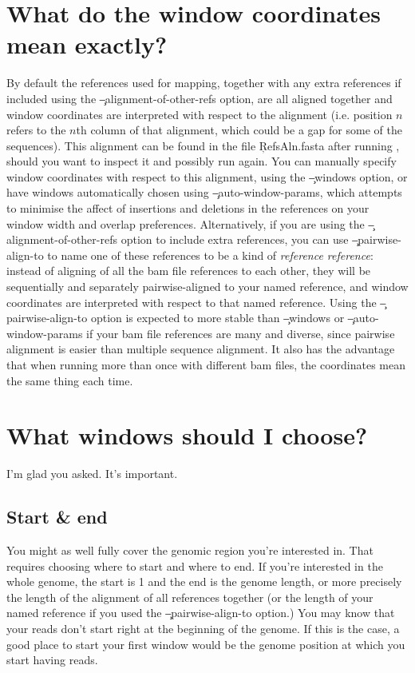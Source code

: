 \section{What do the window coordinates mean exactly?}
By default the references used for mapping, together with any extra references if included using the \c{--alignment-of-other-refs} option, are all aligned together and window coordinates are interpreted with respect to the alignment (i.e. position $n$ refers to the $n$th column of that alignment, which could be a gap for some of the sequences).
This alignment can be found in the file \c{RefsAln.fasta} after running \p, should you want to inspect it and possibly run again.
You can manually specify window coordinates with respect to this alignment, using the \c{--windows} option, or have windows automatically chosen using \c{--auto-window-params}, which attempts to minimise the affect of insertions and deletions in the references on your window width and overlap preferences.
Alternatively, if you are using the \c{--alignment-of-other-refs} option to include extra references, you can use \c{--pairwise-align-to} to name one of these references to be a kind of {\it reference reference}: instead of aligning of all the bam file references to each other, they will be sequentially and separately pairwise-aligned to your named reference, and window coordinates are interpreted with respect to that named reference.
Using the \c{--pairwise-align-to} option is expected to more stable than \c{--windows} or \c{--auto-window-params} if your bam file references are many and diverse, since pairwise alignment is easier than multiple sequence alignment.
It also has the advantage that when running \p more than once with different bam files, the coordinates mean the same thing each time.

\section{What windows should I choose?}
I'm glad you asked.
It's important.

\subsection{Start \& end}

You might as well fully cover the genomic region you're interested in.
That requires choosing where to start and where to end.
If you're interested in the whole genome, the start is 1 and the end is the genome length, or more precisely the length of the alignment of all references together (or the length of your named reference if you used the \c{--pairwise-align-to} option.)
You may know that your reads don't start right at the beginning of the genome.
If this is the case, a good place to start your first window would be the genome position at which you start having reads.

